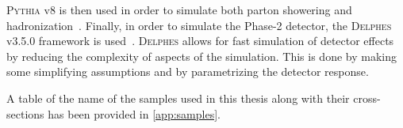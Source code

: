 \textsc{Pythia} v8 is then used in order to simulate both parton showering and hadronization~\cite{Sjostrand:2014zea}.
Finally, in order to simulate the Phase-2 detector, the \textsc{Delphes} v3.5.0 framework is used~\cite{deFavereau:2014dph,Selvaggi:2014mya,Selvaggi:2016ydq}.
\textsc{Delphes} allows for fast simulation of detector effects by reducing the complexity of aspects of the simulation. This is done by making some simplifying assumptions and by parametrizing the detector response.

A table of the name of the samples used in this thesis along with their cross-sections has been provided in \cref{app:samples}.